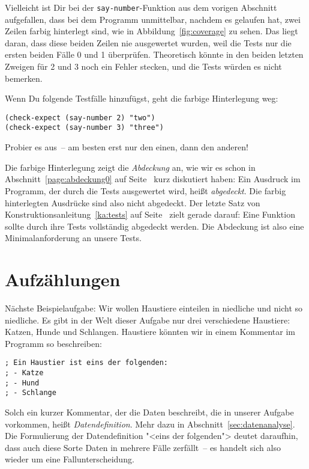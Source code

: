Vielleicht ist Dir bei der \lstinline{say-number}-Funktion aus dem
vorigen Abschnitt aufgefallen, dass bei dem Programm unmittelbar, nachdem
es gelaufen hat, zwei Zeilen farbig
hinterlegt sind, wie in Abbildung~\ref{fig:coverage} zu sehen.  Das liegt
daran, dass diese beiden Zeilen nie ausgewertet wurden, weil die
Tests nur die ersten beiden Fälle 0 und 1 überprüfen.  Theoretisch
könnte in den beiden letzten Zweigen für 2 und 3 noch ein Fehler
stecken, und die Tests würden es nicht bemerken.

Wenn Du folgende Testfälle hinzufügst, geht die farbige Hinterlegung weg:
%
\begin{lstlisting}
(check-expect (say-number 2) "two")
(check-expect (say-number 3) "three")
\end{lstlisting}
%
Probier es aus~-- am besten erst nur den einen, dann den anderen!

Die farbige Hinterlegung zeigt die \textit{Abdeckung} an, wie wir es
schon in Abschnitt~\ref{page:abdeckung0} auf
Seite~\pageref{page:abdeckung0} kurz diskutiert haben: Ein Ausdruck im
Programm, der durch die Tests ausgewertet wird, heißt
\textit{abgedeckt}.  Die farbig hinterlegten Ausdrücke sind also nicht
abgedeckt.  Der letzte Satz von Konstruktionsanleitung~\ref{ka:tests}
auf Seite~\pageref{ka:tests} zielt gerade darauf: Eine Funktion sollte
durch ihre Tests vollständig abgedeckt werden.  Die Abdeckung ist also
eine Minimalanforderung an unsere Tests.

\section{Aufzählungen}

Nächste Beispielaufgabe: Wir wollen Haustiere einteilen in niedliche
und nicht so niedliche.  Es gibt in der Welt dieser Aufgabe nur drei
verschiedene Haustiere: Katzen, Hunde und Schlangen.  Haustiere
könnten wir in einem Kommentar im Programm so beschreiben:
%
\label{sec:datendefinition}
\begin{lstlisting}
; Ein Haustier ist eins der folgenden:
; - Katze
; - Hund
; - Schlange
\end{lstlisting}
%
Solch ein kurzer Kommentar, der die Daten beschreibt, die in unserer
Aufgabe vorkommen, heißt
\textit{Datendefinition}.  Mehr dazu in
Abschnitt~\ref{sec:datenanalyse}.  Die Formulierung der
Datendefinition "<eins der folgenden"> deutet daraufhin, dass auch
diese Sorte Daten in mehrere Fälle zerfällt~-- es handelt sich also
wieder um eine Fallunterscheidung.

